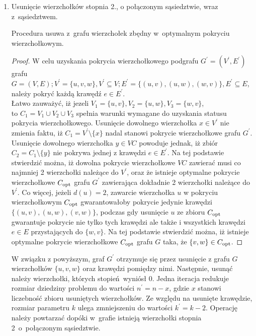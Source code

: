 \begin{enumerate}
  \item Usunięcie wierzchołków stopnia 2., o połączonym sąsiedztwie, wraz 
    z~sąsiedztwem.   
    \begin{theorem}
      Procedura usuwa z~grafu wierzchołek zbędny w~optymalnym pokryciu wierzchołkowym.
    \end{theorem}
    \begin{proof}
      W celu uzyskania pokrycia wierzchołkowego podgrafu $G^\prime=(V^\prime,E^\prime)$
      grafu ${G=(V,E); V^\prime=\{u, v, w\}, V^\prime \subseteq V; E^\prime=\{(u,v),
      (u,w), (w,v)\}, E^\prime \subseteq E}$, należy pokryć każdą krawędź $e \in
      E^\prime$.\\ 
      Łatwo zauważyć, iż jezeli ${V_1=\{u,v\}, V_2=\{u,w\}, V_3=\{w,v\}}$,\\ 
      to ${C_1=V_1 \cup V_2 \cup V_3}$ spełnia warunki wymagane do uzyskania 
      statusu pokrycia wierzchołkowego.
      Usunięcie dowolnego wierzchołka $x \in V^\prime$ nie zmienia faktu, iż 
      ${C_1=V^\prime \setminus \{x\}}$ nadal stanowi pokrycie wierzchołkowe grafu $G^\prime$.
      Usunięcie dowolnego wierzchołka $y \in VC$ powoduje jednak, iż zbiór
      $C_2=C_1 \setminus \{y\}$ nie pokrywa jednej z krawędzi $e \in E^\prime$.
      Na tej podstawie stwierdzić można, iż dowolna pokrycie wierzchołkowe
      $VC$ zawierać musi co najmniej 2 wierzchołki należące do $V^\prime$, oraz
      że istnieje optymalne pokrycie wierzchołkowe $C_{\textnormal{opt}}$ grafu $G^\prime$
      zawierająca dokładnie 2 wierzchołki należące do $V^\prime$.
      Co więcej, jeżeli $d(u)=2$, zawarcie wierzchołka $u$ w pokryciu wierzchołkowym $C_{\textnormal{opt}}$ gwarantowałoby pokrycie jedynie krawędzi
      $\{(u,v), (u,w), (v,w)\}$, podczas gdy usunięcie $u$ ze zbioru $C_{\textnormal{opt}}$ gwarantuje 
      pokrycie nie tylko tych krawędzi ale także i wszystkich krawędzi $e \in E$
      przystających do $\{w, v\}$.
      Na tej podstawie stwierdzić można, iż istnieje optymalne pokrycie wierzchołkowe $C_{\textnormal{opt}}$ grafu $G$ taka, że $\{v,w\} \in C_{\textnormal{opt}}$.
    \end{proof}
    W związku z powyższym, graf $G^\prime$ otrzymuje się przez usunięcie z grafu
    $G$ wierzchołków $\{u,v,w\}$ oraz krawędzi pomiędzy nimi.
    Następnie, usunąć należy wierzchołki, których stopień wyniósł 0.
    Jedna iteracja redukuje rozmiar dziedziny problemu do wartości
    $n^\prime=n-x$, gdzie $x$ stanowi liczebność zbioru usuniętych wierzchołków.
    Ze względu na usunięte krawędzie, rozmiar parametru $k$ ulega zmniejszeniu 
    do wartości $k^\prime=k-2$.
    Operację należy powtarzać dopóki w~grafie istnieją wierzchołki stopnia 2\
    o~połączonym sąsiedztwie.


\end{enumerate}
